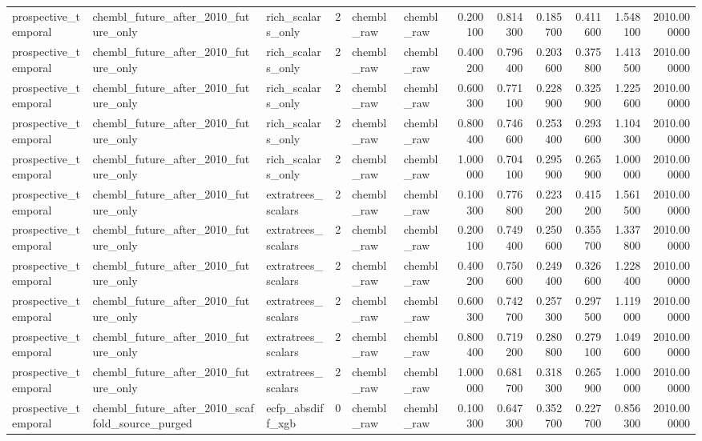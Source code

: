 \begin{longtable}{lllrllrrrrrr}
prospective\_temporal & chembl\_future\_after\_2010\_future\_only & rich\_scalars\_only & 2 & chembl\_raw & chembl\_raw & 0.200100 & 0.814300 & 0.185700 & 0.411600 & 1.548100 & 2010.000000 \\
prospective\_temporal & chembl\_future\_after\_2010\_future\_only & rich\_scalars\_only & 2 & chembl\_raw & chembl\_raw & 0.400200 & 0.796400 & 0.203600 & 0.375800 & 1.413500 & 2010.000000 \\
prospective\_temporal & chembl\_future\_after\_2010\_future\_only & rich\_scalars\_only & 2 & chembl\_raw & chembl\_raw & 0.600300 & 0.771100 & 0.228900 & 0.325900 & 1.225600 & 2010.000000 \\
prospective\_temporal & chembl\_future\_after\_2010\_future\_only & rich\_scalars\_only & 2 & chembl\_raw & chembl\_raw & 0.800400 & 0.746600 & 0.253400 & 0.293600 & 1.104300 & 2010.000000 \\
prospective\_temporal & chembl\_future\_after\_2010\_future\_only & rich\_scalars\_only & 2 & chembl\_raw & chembl\_raw & 1.000000 & 0.704100 & 0.295900 & 0.265900 & 1.000000 & 2010.000000 \\
prospective\_temporal & chembl\_future\_after\_2010\_future\_only & extratrees\_scalars & 2 & chembl\_raw & chembl\_raw & 0.100300 & 0.776800 & 0.223200 & 0.415200 & 1.561500 & 2010.000000 \\
prospective\_temporal & chembl\_future\_after\_2010\_future\_only & extratrees\_scalars & 2 & chembl\_raw & chembl\_raw & 0.200100 & 0.749400 & 0.250600 & 0.355700 & 1.337800 & 2010.000000 \\
prospective\_temporal & chembl\_future\_after\_2010\_future\_only & extratrees\_scalars & 2 & chembl\_raw & chembl\_raw & 0.400200 & 0.750600 & 0.249400 & 0.326600 & 1.228400 & 2010.000000 \\
prospective\_temporal & chembl\_future\_after\_2010\_future\_only & extratrees\_scalars & 2 & chembl\_raw & chembl\_raw & 0.600300 & 0.742700 & 0.257300 & 0.297500 & 1.119000 & 2010.000000 \\
prospective\_temporal & chembl\_future\_after\_2010\_future\_only & extratrees\_scalars & 2 & chembl\_raw & chembl\_raw & 0.800400 & 0.719200 & 0.280800 & 0.279100 & 1.049600 & 2010.000000 \\
prospective\_temporal & chembl\_future\_after\_2010\_future\_only & extratrees\_scalars & 2 & chembl\_raw & chembl\_raw & 1.000000 & 0.681700 & 0.318300 & 0.265900 & 1.000000 & 2010.000000 \\
prospective\_temporal & chembl\_future\_after\_2010\_scaffold\_source\_purged & ecfp\_absdiff\_xgb & 0 & chembl\_raw & chembl\_raw & 0.100300 & 0.647300 & 0.352700 & 0.227700 & 0.856300 & 2010.000000 \\

\end{longtable}
